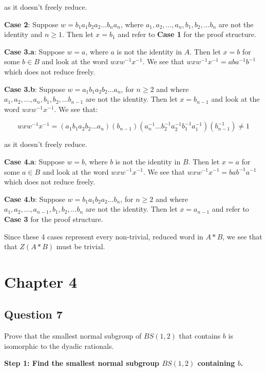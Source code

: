 \documentclass[12pt]{article}%
\begin{document}
as it doesn't freely reduce.

\textbf{Case 2}: Suppose $w=b_{1}a_{1}b_{2}a_{2}\ldots b_{n}a_{n}$, where
$a_1,a_2,\ldots ,a_n, b_1,b_2,\ldots b_n$ are not the identity and $n\geq 1$. Then let $x=b_1$ and refer
to \textbf{Case 1} for the proof structure. 

\textbf{Case 3.a}:
Suppose $w=a$, where $a$ is not the identity in $A$. Then let $x=b$ for some $b\in B$ and look at the word
$wxw^{-1}x^{-1}$. We see that $wxw^{-1}x^{-1}=aba^{-1}b^{-1}$ which does not reduce freely.

\textbf{Case 3.b}: 
Suppose $w=a_{1}b_{1}a_{2}b_{2}\ldots a_{n}$, for $n\geq 2$ and where $a_1,a_2,\ldots ,a_n, b_1,b_2,\ldots b_{n-1}$ are not the identity. Then let $x=b_{n-1}$ and look at the word $wxw^{-1}x^{-1}$. We see that:

\begin{dmath}
wxw^{-1}x^{-1}= (a_{1}b_{1}a_{2}b_{2}\ldots a_{n}) (b_{n-1}) (a_{n}^{-1}\ldots b_{2}^{-1}a_{2}^{-1}b_{1}^{-1}a_{1}^{-1}) (b_{n-1}^{-1}) \neq{} 1
\end{dmath}

as it doesn't freely reduce.

\textbf{Case 4.a}:
Suppose $w=b$, where $b$ is not the identity in $B$. Then let $x=a$ for some $a\in B$ and look at the word
$wxw^{-1}x^{-1}$. We see that $wxw^{-1}x^{-1}=bab^{-1}a^{-1}$ which does not reduce freely.

\textbf{Case 4.b}: Suppose $w=b_{1}a_{1}b_{2}a_{2}\ldots b_{n}$, for $n\geq 2$ and where
$a_1,a_2,\ldots ,a_{n-1}, b_1,b_2,\ldots b_n$ are not the identity. Then let $x=a_{n-1}$ and refer to
\textbf{Case 3} for the proof structure. 

Since these 4 cases represent every non-trivial, reduced word in $A*B$, we see that that $Z(A*B)$ must
be trivial.

\section*{Chapter 4}

\subsection*{Question 7}

Prove that the smallest normal subgroup of $BS(1, 2)$ that contains $b$ is isomorphic to the dyadic
rationals.

\textbf{Step 1: Find the smallest normal subgroup $BS(1,2)$ containing $b$.}
\end{document}
